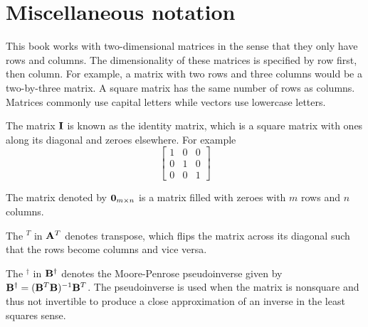 \section{Miscellaneous notation}

This book works with two-dimensional matrices in the sense that they only have
rows and columns. The dimensionality of these matrices is specified by row
first, then column. For example, a matrix with two rows and three columns would
be a two-by-three matrix. A square matrix has the same number of rows as
columns. Matrices commonly use capital letters while vectors use lowercase
letters.

The matrix $\mathbf{I}$ is known as the identity matrix, which is a square matrix
with ones along its diagonal and zeroes elsewhere. For example
\begin{equation*}
  \begin{bmatrix}
    1 & 0 & 0 \\
    0 & 1 & 0 \\
    0 & 0 & 1
  \end{bmatrix}
\end{equation*}

The matrix denoted by $\mathbf{0}_{m \times n}$ is a matrix filled with zeroes with
$m$ rows and $n$ columns.

The $^T$ in $\mathbf{A}^T$ denotes transpose, which flips the matrix across its
diagonal such that the rows become columns and vice versa.

The $^\dagger$ in $\mathbf{B}^\dagger$ denotes the Moore-Penrose pseudoinverse
given by $\mathbf{B}^\dagger = (\mathbf{B}^T\mathbf{B})^{-1}\mathbf{B}^T$. The pseudoinverse
is used when the matrix is nonsquare and thus not invertible to produce a close
approximation of an inverse in the least squares sense.
